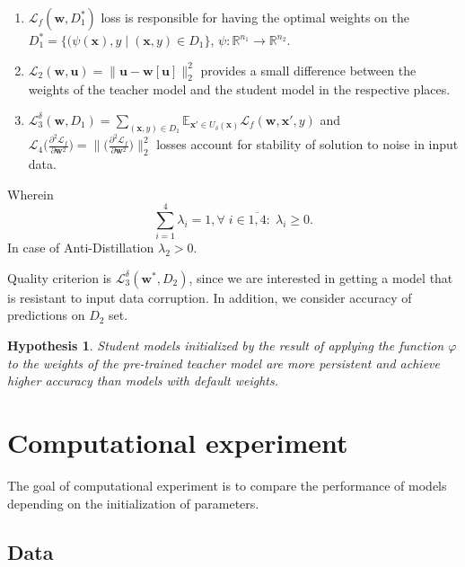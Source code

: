 \documentclass[80pt]{article}
\begin{document}
\begin{enumerate}
    \item $\mathcal{L}_f(\mathbf{w}, D_1^*)$ loss is responsible for having the optimal weights on the $D_1^* = \{(\psi (\textbf{x}), y \;|\; (\textbf{x}, y) \in D_1\}$, $\psi: \mathbb{R}^{n_1} \rightarrow \mathbb{R}^{n_2}$.
    \item $\mathcal{L}_2 (\mathbf{w}, \mathbf{u}) = \|\textbf{u} - \textbf{w}[\textbf{u}]\|^2_2$ provides a small difference between the weights of the teacher model and the student model in the respective places.
    \item $\mathcal{L}_3^\delta (\mathbf{w}, D_1) = \displaystyle \sum \limits_{(\textbf{x}, y) \in D_1} \displaystyle \mathbb{E}_{\textbf{x}' \in U_\delta(\textbf{x})} \mathcal{L}_f(\mathbf{w}, \textbf{x}', y)$  and  $\mathcal{L}_4 \bigl(\displaystyle \frac{\partial^2 \mathcal{L}_f}{\partial \mathbf{w}^2}\bigr) = \|\bigl(\displaystyle \frac{\partial^2 \mathcal{L}_f}{\partial \mathbf{w}^2}\bigr)\|^2_2$ losses account for stability of solution to noise in input data.
\end{enumerate}

Wherein \[\sum\limits_{i=1}^4 \lambda_i =1, \forall\; i \in \overline{1, 4}:\; \lambda_i \ge 0.\]
In case of Anti-Distillation $\lambda_2 >0$. 

Quality criterion is $\mathcal{L}_3^\delta (\mathbf{w}^*, D_2)$, since we are interested in getting a model that is resistant to input data corruption. In addition, we consider accuracy of predictions on $D_2$ set.

\newtheorem{hypothesis}{Hypothesis}
\begin{hypothesis}
Student models initialized by the result of applying the function $\varphi$ to the weights of the pre-trained teacher model are more persistent and achieve higher accuracy than models with default weights.
\end{hypothesis}

\section{Computational experiment}

The goal of computational experiment is to compare the performance of models depending on the initialization of parameters. 

\subsection{Data}
\end{document}
